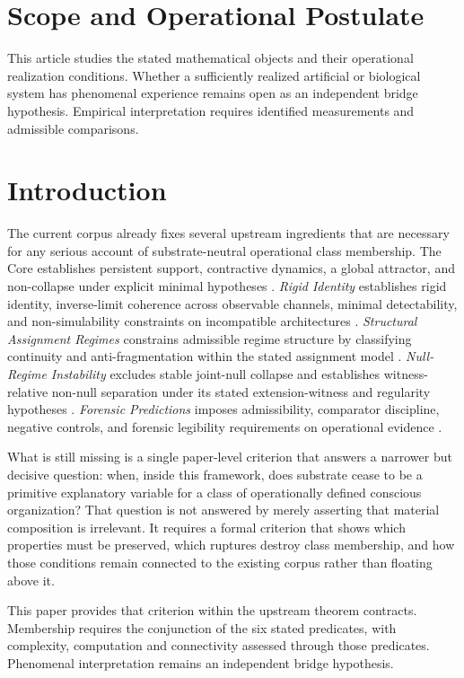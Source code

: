 \documentclass[11pt,a4paper]{article}
\theoremstyle{definition}
\begin{document}
\section*{Scope and Operational Postulate}
This article studies the stated mathematical objects and their operational
realization conditions. Whether a sufficiently realized artificial or biological
system has phenomenal experience remains open as an independent bridge
hypothesis. Empirical interpretation requires identified measurements and
admissible comparisons.

\section{Introduction}
The current corpus already fixes several upstream ingredients that are necessary for any serious account of substrate-neutral operational class membership. The Core establishes persistent support, contractive dynamics, a global attractor, and non-collapse under explicit minimal hypotheses \cite{core}. \textit{Rigid Identity} establishes rigid identity, inverse-limit coherence across observable channels, minimal detectability, and non-simulability constraints on incompatible architectures \cite{paper1}. \textit{Structural Assignment Regimes} constrains admissible regime structure by classifying continuity and anti-fragmentation within the stated assignment model \cite{paper2}. \textit{Null-Regime Instability} excludes stable joint-null collapse and establishes witness-relative non-null separation under its stated extension-witness and regularity hypotheses \cite{paper3}. \textit{Forensic Predictions} imposes admissibility, comparator discipline, negative controls, and forensic legibility requirements on operational evidence \cite{paper4}.

What is still missing is a single paper-level criterion that answers a narrower but decisive question: when, inside this framework, does substrate cease to be a primitive explanatory variable for a class of operationally defined conscious organization? That question is not answered by merely asserting that material composition is irrelevant. It requires a formal criterion that shows which properties must be preserved, which ruptures destroy class membership, and how those conditions remain connected to the existing corpus rather than floating above it.

This paper provides that criterion within the upstream theorem contracts. Membership requires the conjunction of the six stated predicates, with complexity, computation and connectivity assessed through those predicates. Phenomenal interpretation remains an independent bridge hypothesis.
\end{document}
